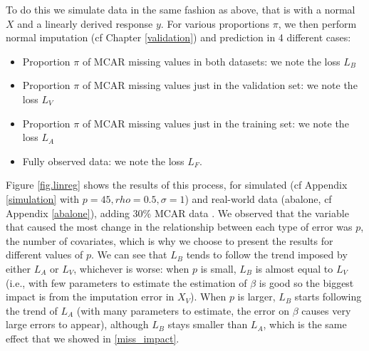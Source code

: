 To do this we simulate data in the same fashion as above, that is with a normal $X$ and a linearly derived response $y$. For various proportions $\pi$, we then perform normal imputation (cf Chapter \ref{validation}) and prediction in 4 different cases:
\begin{itemize}
\item Proportion $\pi$ of MCAR missing values in both datasets: we note the loss $L_B$
\item Proportion $\pi$ of MCAR missing values just in the validation set: we note the loss $L_V$
\item Proportion $\pi$ of MCAR missing values just in the training set: we note the loss $L_A$
\item Fully observed data: we note the loss $L_F$.
\end{itemize}

Figure \ref{fig.linreg} shows the results of this process, for simulated (cf Appendix \ref{simulation} with $p=45, rho=0.5, \sigma=1$) and real-world data (abalone, cf Appendix \ref{abalone}), adding 30\% MCAR data . We observed that the variable that caused the most change in the relationship between each type of error was $p$, the number of covariates, which is why we choose to present the results for different values of $p$. We can see that $L_B$ tends to follow the trend imposed by either $L_A$ or $L_V$, whichever is worse: when $p$ is small, $L_B$ is almost equal to $L_V$ (i.e., with few parameters to estimate the estimation of $\beta$ is good so the biggest impact is from the imputation error in $X_V$). When $p$ is larger, $L_B$ starts following the trend of $L_A$ (with many parameters to estimate, the error on $\beta$ causes very large errors to appear), although $L_B$ stays smaller than $L_A$, which is the same effect that we showed in \ref{miss_impact}.

